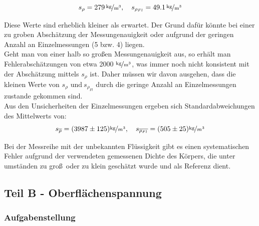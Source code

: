 \documentclass[11pt,a4paper]{article}
\begin{document}
$$s_\rho=279\, \mathrm{\nicefrac{\textrm{kg}}{m^3}},\quad s_{\rho_{Fl}}=49.1\, \mathrm{\nicefrac{\textrm{kg}}{m^3}}$$

Diese Werte sind erheblich kleiner als erwartet. Der Grund daf\"ur k\"onnte bei einer zu groben Absch\"atzung der Messungenauigkeit oder aufgrund der geringen Anzahl an Einzelmessungen (5 bzw. 4) liegen.\\

Geht man von einer halb so gro\ss en Messungenauigkeit aus, so erh\"alt man Fehlerabsch\"atzungen von etwa 2000 $\mathrm{\nicefrac{\textrm{kg}}{m^3}}$, was immer noch nicht konsistent mit der Absch\"atzung mittels $s_\rho$ ist. Daher m\"ussen wir davon ausgehen, dass die kleinen Werte von $s_\rho\textrm{ und}\ s_{\rho_{Fl}}$ durch die geringe Anzahl an Einzelmessungen zustande gekommen sind.\\

Aus den Unsicherheiten der Einzelmessungen ergeben sich Standardabweichungen des Mittelwerts von:\\
\[
s_{\overline{\rho}}=(3987\pm125)\nicefrac{\textrm{kg}}{m^3},\quad
s_{\overline{\rho_{Fl}}}=(505\pm25)\nicefrac{\textrm{kg}}{m^3}
\]

Bei der Messreihe mit der unbekannten Fl\"ussigkeit gibt es einen systematischen Fehler aufgrund der verwendeten gemessenen Dichte des K\"orpers, die unter umst\"anden zu gro\ss\ oder zu klein gesch\"atzt wurde und als Referenz dient.
\pagebreak
\subsection{Teil B - Oberfl\"achenspannung}
\subsubsection{Aufgabenstellung}
\end{document}
